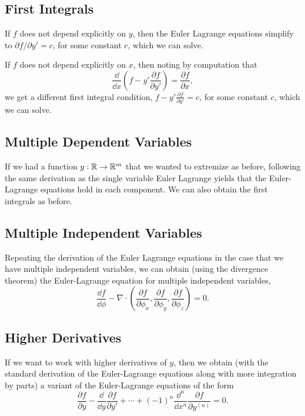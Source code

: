 \documentclass[a4paper]{amsart}
\begin{document}
\subsection*{First Integrals}

If $f$ does not depend explicitly on $y$, then the Euler Lagrange equations simplify to $\partial f/\partial y' = c$, for some constant $c$, which we can solve.

If $f$ does not depend explicitly on $x$, then noting by computation that
$$
\frac{\dd}{\dd x} \left(f - y' \frac{\partial f}{\partial y'}\right) = \frac{\partial f}{\partial x},
$$
we get a different first integral condition, $f - y' \frac{\partial f}{\partial y'} = c$, for some constant $c$, which we can solve.

\subsection*{Multiple Dependent Variables}

If we had a function $y: \mathbb{R} \rightarrow \mathbb{R}^m$ that we wanted to extremize as before, following the same derivation as the single variable Euler Lagrange yields that the Euler-Lagrange equations hold in each component. We can also obtain the first integrals as before.

\subsection*{Multiple Independent Variables}

Repeating the derivation of the Euler Lagrange equations in the case that we have multiple independent variables, we can obtain (using the divergence theorem) the Euler-Lagrange equation for multiple independent variables,
$$
\frac{\dd f}{\dd \phi} - \nabla \cdot \left(\frac{\partial f}{\partial \phi_x}, \frac{\partial f}{\partial \phi_y}, \frac{\partial f}{\partial \phi_z}\right) = 0.
$$

\subsection*{Higher Derivatives}

If we want to work with higher derivatives of $y$, then we obtain (with the standard derivation of the Euler-Lagrange equations along with more integration by parts) a variant of the Euler-Lagrange equations of the form
$$
\frac{\partial f}{\partial y} - \frac{\dd }{\dd y} \frac{\partial f}{\partial y'} + \cdots + (-1)^n \frac{\dd^n}{\dd x^n} \frac{\partial f}{\partial y^(n)} = 0.
$$
\end{document}
